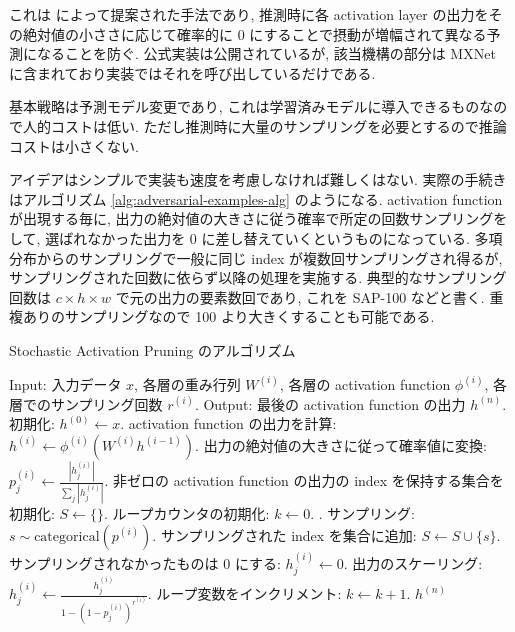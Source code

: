 これは \cite{dhillon2018stochastic} によって提案された手法であり, 推測時に各 activation layer の出力をその絶対値の小ささに応じて確率的に 0 にすることで摂動が増幅されて異なる予測になることを防ぐ.
公式実装は公開されているが, 該当機構の部分は MXNet \cite{chen2015mxnet} に含まれており実装ではそれを呼び出しているだけである.

基本戦略は予測モデル変更であり, これは学習済みモデルに導入できるものなので人的コストは低い.
ただし推測時に大量のサンプリングを必要とするので推論コストは小さくない.

アイデアはシンプルで実装も速度を考慮しなければ難しくはない.
実際の手続きはアルゴリズム \ref{alg:adversarial-examples-alg} のようになる.
activation function が出現する毎に, 出力の絶対値の大きさに従う確率で所定の回数サンプリングをして, 選ばれなかった出力を 0 に差し替えていくというものになっている.
多項分布からのサンプリングで一般に同じ index が複数回サンプリングされ得るが, サンプリングされた回数に依らず以降の処理を実施する.
典型的なサンプリング回数は $c \times h \times w$ で元の出力の要素数回であり, これを SAP-100 などと書く.
重複ありのサンプリングなので 100 より大きくすることも可能である.
%
\begin{algorithm}
\caption{Stochastic Activation Pruning のアルゴリズム}
\label{alg:stochastic-activation-alg}
\begin{algorithmic}[1]
    \State Input: 入力データ $x$, 各層の重み行列 $W^{(i)}$, 各層の activation function $\phi^{(i)}$, 各層でのサンプリング回数 $r^{(i)}$.
    \State Output: 最後の activation function の出力 $h^{(n)}$.
    \State 初期化: $h^{(0)} \leftarrow x$.
    \State activation function の出力を計算: $h^{(i)} \leftarrow \phi^{(i)} (W^{(i)} h^{(i - 1)}) $.
    \State 出力の絶対値の大きさに従って確率値に変換: $p_{j}^{(i)} \leftarrow \frac{|h_{j}^{(i)}|}{\sum_j |h_{j}^{(i)}|}$.
    \State 非ゼロの activation function の出力の index を保持する集合を初期化: $S \leftarrow \{\}$.
    \State ループカウンタの初期化: $k \leftarrow 0$.
    .
    \State サンプリング: $s \sim \text{categorical} (p^{(i)})$.
    \State サンプリングされた index を集合に追加: $S \leftarrow S \cup \{s\}$.
    \State サンプリングされなかったものは 0 にする: $h_{j}^{(i)} \leftarrow 0$.
    \EndFor
    \State 出力のスケーリング: $h_{j}^{(i)} \leftarrow \frac{h_{j}^{(i)}}{1 - (1 - p^{(i)}_{j})^{r^{(i)}}}$.
    \EndFor
    \State ループ変数をインクリメント: $k \leftarrow k + 1$.
    \EndWhile
    \EndFor
    \Return $h^{(n)}$
\end{algorithmic} 
\end{algorithm}

